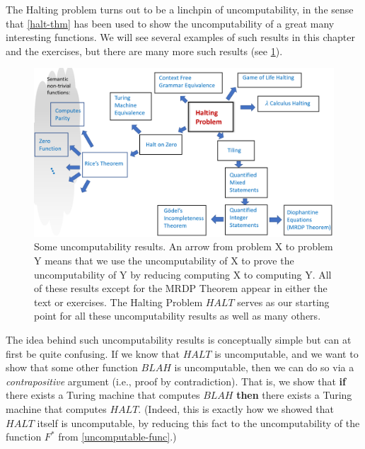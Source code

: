 The Halting problem turns out to be a linchpin of uncomputability, in
the sense that \cref{halt-thm} has been used to show the uncomputability
of a great many interesting functions. We will see several examples of
such results in this chapter and the exercises, but there are many more
such results (see \cref{haltreductions}).


\begin{figure}
\centering
\includegraphics[width=\textwidth, height=0.25\paperheight, keepaspectratio]{../figure/reductions_from_halting.png}
\caption{Some uncomputability results. An arrow from problem X to
problem Y means that we use the uncomputability of X to prove the
uncomputability of Y by reducing computing X to computing Y. All of
these results except for the MRDP Theorem appear in either the text or
exercises. The Halting Problem \(\ensuremath{\mathit{HALT}}\) serves as
our starting point for all these uncomputability results as well as many
others.}
\label{haltreductions}
\end{figure}

The idea behind such uncomputability results is conceptually simple but
can at first be quite confusing. If we know that
\(\ensuremath{\mathit{HALT}}\) is uncomputable, and we want to show that
some other function \(\ensuremath{\mathit{BLAH}}\) is uncomputable, then
we can do so via a \emph{contrapositive} argument (i.e., proof by
contradiction). That is, we show that \textbf{if} there exists a Turing
machine that computes \(\ensuremath{\mathit{BLAH}}\) \textbf{then} there
exists a Turing machine that computes \(\ensuremath{\mathit{HALT}}\).
(Indeed, this is exactly how we showed that
\(\ensuremath{\mathit{HALT}}\) itself is uncomputable, by reducing this
fact to the uncomputability of the function \(F^*\) from
\cref{uncomputable-func}.)

